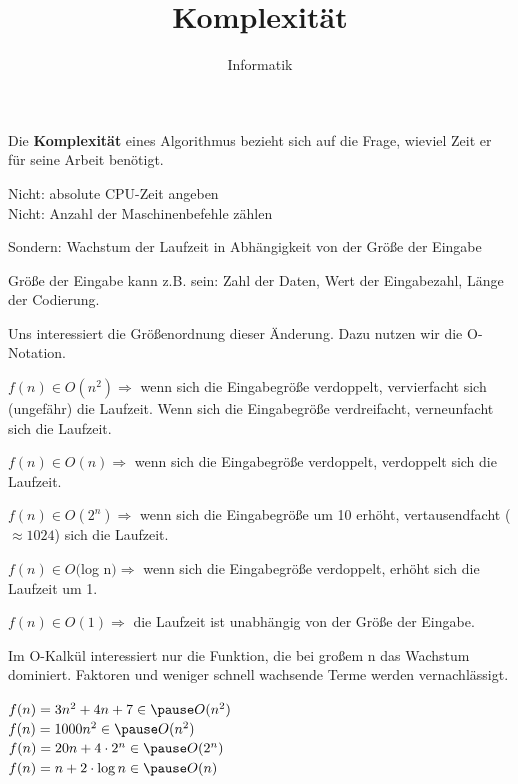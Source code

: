 \documentclass{beamer}
\begin{document}
\title{Komplexität}   
\author{Informatik} 
\date{ } 
\lstset{language=Python, tabsize=4, showstringspaces=false,basicstyle=\footnotesize,mathescape=true}

\frame{\titlepage} 


\begin{frame}[fragile]
Die \textbf{Komplexität} eines Algorithmus bezieht sich auf die Frage, wieviel Zeit er für seine Arbeit benötigt. \pause

Nicht: absolute CPU-Zeit angeben \\
Nicht: Anzahl der Maschinenbefehle zählen  

Sondern:  Wachstum der Laufzeit in Abhängigkeit
 von der Größe der Eingabe

Größe der Eingabe kann z.B. sein: Zahl der Daten,  Wert der Eingabezahl,   Länge der Codierung. 
\end{frame}

\begin{frame}[fragile]
Uns interessiert die Größenordnung dieser Änderung.  Dazu nutzen wir die O-Notation.  

$f(n) \in O(n^2) \Rightarrow$  wenn sich die Eingabegröße verdoppelt, \pause vervierfacht sich (ungefähr) die Laufzeit.  
Wenn sich die Eingabegröße verdreifacht, \pause verneunfacht sich die Laufzeit. 

$f(n) \in O(n) \Rightarrow$  wenn sich die Eingabegröße verdoppelt, \pause verdoppelt sich die Laufzeit. 

$f(n) \in O(2^n) \Rightarrow$  wenn sich die Eingabegröße um 10 erhöht, \pause vertausendfacht ($\approx 1024$) sich die Laufzeit. 

$f(n) \in O($log n$) \Rightarrow$  wenn sich die Eingabegröße verdoppelt, \pause erhöht sich die Laufzeit um 1. 

$f(n) \in O(1)  \Rightarrow$  \pause die Laufzeit ist unabhängig von der Größe der Eingabe.
\end{frame}


\begin{frame}[fragile]
Im O-Kalkül interessiert nur die Funktion, die bei großem n das Wachstum dominiert. Faktoren und weniger schnell wachsende Terme werden vernachlässigt.  

$f(n) = 3n^2 + 4n + 7  \in \pause O(n^2)$  \\ 
$f(n) = 1000n^2 \in \pause O(n^2)$  \\  
$f(n) =20n + 4 \cdot 2^n \in \pause O(2^n)$ \\  
$f(n) =n + 2 \cdot \log n \in \pause O(n)$ \\ 

\end{frame}
\end{document}
